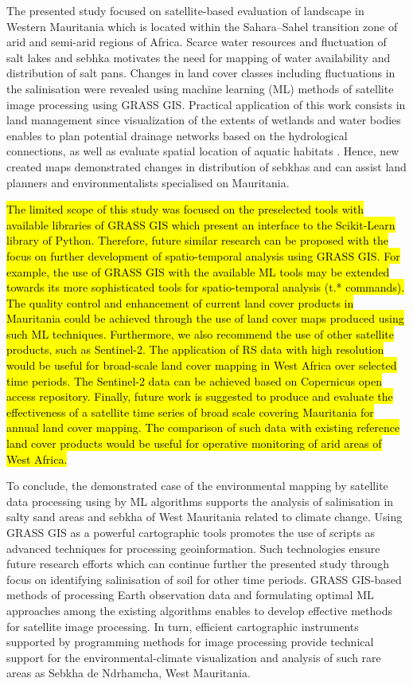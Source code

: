 \documentclass[12pt,a4paper,oneside]{article}
\def \newpar{\vspace{6pt}}
\begin{document}
\newpar The presented study focused on satellite-based evaluation of landscape in Western Mauritania which is located within the Sahara–Sahel transition zone of arid and semi-arid regions of Africa. Scarce water resources and fluctuation of salt lakes and sebhka motivates the need for mapping of water availability and distribution of salt pans. Changes in land cover classes including fluctuations in the salinisation were revealed using machine learning (ML) methods of satellite image processing using GRASS GIS. Practical application of this work consists in land management since visualization of the extents of wetlands and water bodies enables to plan potential drainage networks based on the hydrological connections, as well as evaluate spatial location of aquatic habitats \cite{CAMPOS2012438}. Hence, new created maps demonstrated changes in distribution of sebkhas and can assist land planners and environmentalists specialised on Mauritania.

\newpar \hl{The limited scope of this study was focused on the preselected tools with available libraries of GRASS GIS which present an interface to the Scikit-Learn library of Python. Therefore, future similar research can be proposed with the focus on further development of spatio-temporal analysis using GRASS GIS. For example, the use of GRASS GIS with the available ML tools may be extended towards its more sophisticated tools for spatio-temporal analysis (t.* commands). The quality control and enhancement of current land cover products in Mauritania could be achieved through the use of land cover maps produced using such ML techniques. Furthermore, we also recommend the use of other satellite products, such as Sentinel-2. The application of RS data with high resolution would be useful for broad-scale land cover mapping in West Africa over selected time periods. The Sentinel-2 data can be achieved based on Copernicus open access repository. Finally, future work is suggested to produce and evaluate the effectiveness of a satellite time series of broad scale covering Mauritania for annual land cover mapping. The comparison of such data with existing reference land cover products would be useful for operative monitoring of arid areas of West Africa.}

\newpar To conclude, the demonstrated case of the environmental mapping by satellite data processing using by ML algorithms supports the analysis of salinisation in salty sand areas and sebkha of West Mauritania related to climate change. Using GRASS GIS as a powerful cartographic tools promotes the use of scripts as advanced techniques for processing geoinformation. Such  technologies ensure future research efforts which can continue further the presented study through focus on identifying salinisation of soil for other time periods. GRASS GIS-based methods of processing Earth observation data and formulating optimal ML approaches among the existing algorithms enables to develop effective methods for satellite image processing. In turn, efficient cartographic instruments supported by programming methods for image processing provide technical support for the environmental-climate visualization and analysis of such rare areas as Sebkha de Ndrhamcha, West Mauritania. 
\end{document}
